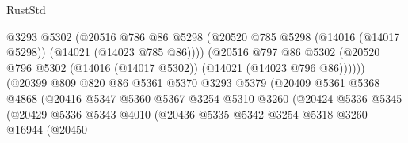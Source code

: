 \begin{lexlean}{RustStd}
\begin{coremodule}
                                      @3293
                                      @5302
                                      (@20516
                                        @786
                                        @86
                                        @5298
                                        (@20520
                                          @785
                                          @5298
                                          (@14016 (@14017 @5298))
                                          (@14021 (@14023 @785 @86))))
                                      (@20516
                                        @797
                                        @86
                                        @5302
                                        (@20520
                                          @796
                                          @5302
                                          (@14016 (@14017 @5302))
                                          (@14021 (@14023 @796 @86))))))
                                  (@20399
                                    @809
                                    @820
                                    @86
                                    @5361
                                    @5370
                                    @3293
                                    @5379
                                    (@20409
                                      @5361
                                      @5368
                                      @4868
                                      (@20416
                                        @5347
                                        @5360
                                        @5367
                                        @3254
                                        @5310
                                        @3260
                                        (@20424
                                          @5336
                                          @5345
                                          (@20429
                                            @5336
                                            @5343
                                            @4010
                                            (@20436
                                              @5335
                                              @5342
                                              @3254
                                              @5318
                                              @3260
                                              @16944
                                              (@20450

\end{coremodule}
\end{lexlean}
